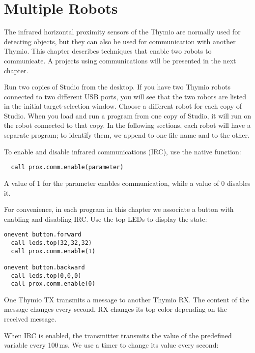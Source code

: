 \part{Multiple Robots}

\label{ch.ir}

The infrared horizontal proximity sensors of the Thymio are normally
used for detecting objects, but they can also be used for communication
with another Thymio. This chapter describes techniques that enable two
robots to communicate. A projects using communications will be presented
in the next chapter.


Run two copies of Studio from the desktop. If you have two Thymio robots
connected to two different USB ports, you will see that the two robots
are listed in the initial target-selection window. Choose a different
robot for each copy of Studio. When you load and run a program from one
copy of Studio, it will run on the robot connected to that copy. In the
following sections, each robot will have a separate program; to identify
them, we append  to one file name and  to the other. 


To enable and disable infrared communications (IRC), use the native function:
\begin{verbatim}
  call prox.comm.enable(parameter)
\end{verbatim}
A value of 1 for the parameter enables communication, while a value of 0
disables it.

For convenience, in each program in this chapter we associate a button
with enabling and disabling IRC. Use the top LEDs to display the state:

\begin{verbatim}
onevent button.forward
  call leds.top(32,32,32)
  call prox.comm.enable(1)

onevent button.backward
  call leds.top(0,0,0)
  call prox.comm.enable(0)
\end{verbatim}


One Thymio TX transmits a message to another Thymio RX. The content of
the message changes every second. RX changes its top color depending on
the received message.

When IRC is enabled, the transmitter transmits the value of the
predefined variable  every 100\,ms. We use a timer to
change its value every second:

